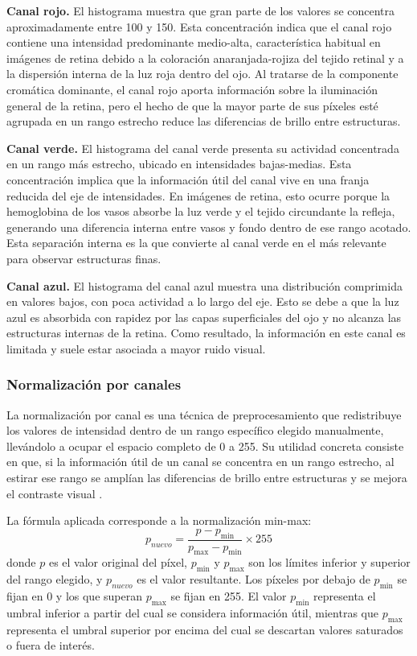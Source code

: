 \documentclass[11pt]{article}
\begin{document}
\textbf{Canal rojo.} El histograma muestra que gran parte de los valores se concentra aproximadamente entre 100 y 150. Esta concentración indica que el canal rojo contiene una intensidad predominante medio-alta, característica habitual en imágenes de retina debido a la coloración anaranjada-rojiza del tejido retinal y a la dispersión interna de la luz roja dentro del ojo. Al tratarse de la componente cromática dominante, el canal rojo aporta información sobre la iluminación general de la retina, pero el hecho de que la mayor parte de sus píxeles esté agrupada en un rango estrecho reduce las diferencias de brillo entre estructuras.

\textbf{Canal verde.} El histograma del canal verde presenta su actividad concentrada en un rango más estrecho, ubicado en intensidades bajas-medias. Esta concentración implica que la información útil del canal vive en una franja reducida del eje de intensidades. En imágenes de retina, esto ocurre porque la hemoglobina de los vasos absorbe la luz verde y el tejido circundante la refleja, generando una diferencia interna entre vasos y fondo dentro de ese rango acotado. Esta separación interna es la que convierte al canal verde en el más relevante para observar estructuras finas.

\textbf{Canal azul.} El histograma del canal azul muestra una distribución comprimida en valores bajos, con poca actividad a lo largo del eje. Esto se debe a que la luz azul es absorbida con rapidez por las capas superficiales del ojo y no alcanza las estructuras internas de la retina. Como resultado, la información en este canal es limitada y suele estar asociada a mayor ruido visual.

\subsubsection{Normalización por canales}

La normalización por canal es una técnica de preprocesamiento que redistribuye los valores de intensidad dentro de un rango específico elegido manualmente, llevándolo a ocupar el espacio completo de 0 a 255. Su utilidad concreta consiste en que, si la información útil de un canal se concentra en un rango estrecho, al estirar ese rango se amplían las diferencias de brillo entre estructuras y se mejora el contraste visual \cite{b1}.

La fórmula aplicada corresponde a la normalización min-max:
\begin{equation}
    p_{nuevo} = \frac{p - p_{\min}}{p_{\max} - p_{\min}} \times 255
    \label{eq:normalizacion}
\end{equation}
donde $p$ es el valor original del píxel, $p_{\min}$ y $p_{\max}$ son los límites inferior y superior del rango elegido, y $p_{nuevo}$ es el valor resultante. Los píxeles por debajo de $p_{\min}$ se fijan en 0 y los que superan $p_{\max}$ se fijan en 255. El valor $p_{\min}$ representa el umbral inferior a partir del cual se considera información útil, mientras que $p_{\max}$ representa el umbral superior por encima del cual se descartan valores saturados o fuera de interés.
\end{document}
